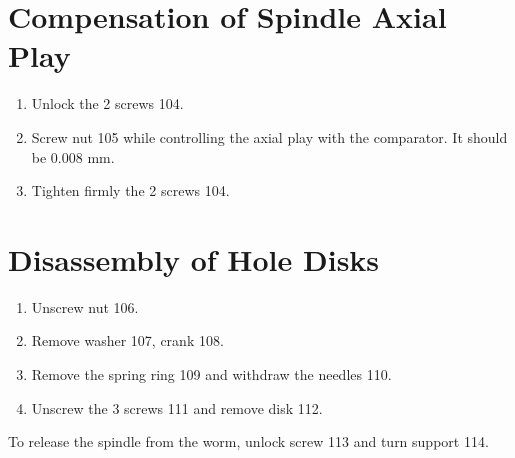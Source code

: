 \section*{Compensation of Spindle Axial Play}
\begin{enumerate}
    \item Unlock the 2 screws 104.
    \item Screw nut 105 while controlling the axial play with the comparator. It should be 0.008 mm.
    \item Tighten firmly the 2 screws 104.
\end{enumerate}

\section*{Disassembly of Hole Disks}
\begin{enumerate}
    \item Unscrew nut 106.
    \item Remove washer 107, crank 108.
    \item Remove the spring ring 109 and withdraw the needles 110.
    \item Unscrew the 3 screws 111 and remove disk 112.
\end{enumerate}

To release the spindle from the worm, unlock screw 113 and turn support 114.
